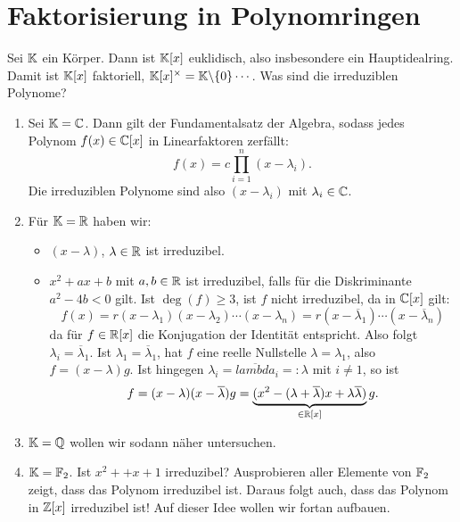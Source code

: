 \section{Faktorisierung in Polynomringen}
\label{sec:galois}

\begin{beispiele}
Sei $\mathbb{K}$ ein Körper. Dann ist $\mathbb{K}[x]$ euklidisch, also insbesondere ein Hauptidealring. Damit ist $\mathbb{K}[x]$ faktoriell, $\mathbb{K}[x]^\times = \mathbb{K} \backslash \{0\} \cdots$. Was sind die irreduziblen Polynome?
\begin{enumerate}
\item Sei $\mathbb{K} = \mathbb{C}$. Dann gilt der Fundamentalsatz der Algebra, sodass jedes Polynom $f(x) \in \mathbb{C}[x]$ in Linearfaktoren zerfällt:
\begin{equation}
f(x) = c \prod_{i=1}^n (x-\lambda_i).
\end{equation}
Die irreduziblen Polynome sind also $(x-\lambda_i)$ mit $\lambda_i \in \mathbb{C}$.
\item Für $\mathbb{K} = \mathbb{R}$ haben wir:
\begin{itemize}
\item $(x-\lambda)$, $\lambda \in \mathbb{R}$ ist irreduzibel.
\item $x^2+ax+b$ mit $a,b \in \mathbb{R}$ ist irreduzibel, falls für die Diskriminante $a^2-4b<0$ gilt. Ist $\deg(f)\geq 3$, ist $f$ nicht irreduzibel, da in $\mathbb{C}[x]$ gilt:
\begin{equation}
f(x) = r(x-\lambda_1)(x-\lambda_2) \cdots (x-\lambda_n)= r(x-\overline{\lambda}_1) \cdots (x -\overline{\lambda}_n)
\end{equation}
da für $f \in \mathbb{R}[x]$ die Konjugation der Identität entspricht. Also folgt $\lambda_i = \overline{\lambda}_1$. Ist $\lambda_1 = \overline{\lambda}_1$, hat $f$ eine reelle Nullstelle $\lambda = \lambda_1$, also $f=(x-\lambda)g$. Ist hingegen $\lambda_i = \overline{lambda}_i =: \lambda$ mit $i \neq 1$, so ist 
\begin{equation}
f = (x-\lambda)(x-\overline{\lambda})g = \underbrace{(x^2 - (\lambda + \overline{\lambda})x + \lambda \overline{\lambda})}_{\in \mathbb{R}[x]}g.
\end{equation} 
\end{itemize}
\item $\mathbb{K} = \mathbb{Q}$ wollen wir sodann näher untersuchen.
\item $\mathbb{K} = \mathbb{F}_2$. Ist $x^2++x+1$ irreduzibel? Ausprobieren aller Elemente von $\mathbb{F}_2$ zeigt, dass das Polynom irreduzibel ist. Daraus folgt auch, dass das Polynom in $\mathbb{Z}[x]$ irreduzibel ist! Auf dieser Idee wollen wir fortan aufbauen.
\end{enumerate}
\end{beispiele}
